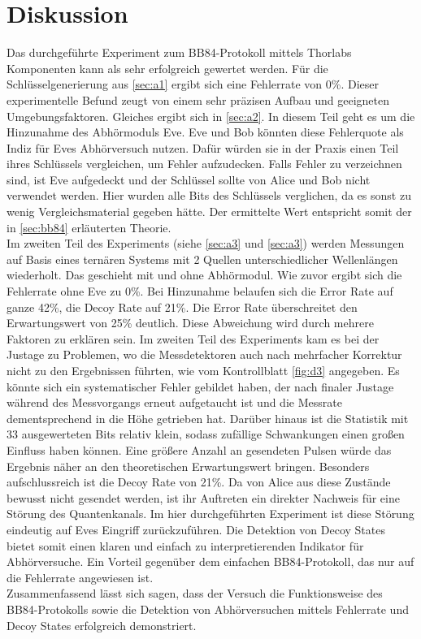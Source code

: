 \section{Diskussion}
\label{sec:Diskussion}

Das durchgeführte Experiment zum BB84-Protokoll mittels Thorlabs Komponenten kann 
als sehr erfolgreich gewertet werden. Für die Schlüsselgenerierung aus \autoref{sec:a1}
ergibt sich eine Fehlerrate von 0\%. Dieser experimentelle Befund zeugt von einem 
sehr präzisen Aufbau und geeigneten Umgebungsfaktoren. Gleiches ergibt sich in 
\autoref{sec:a2}. In diesem Teil geht es um die Hinzunahme des Abhörmoduls Eve. 
Eve und Bob könnten diese Fehlerquote als Indiz für Eves Abhörversuch nutzen. Dafür
würden sie in der Praxis einen Teil ihres Schlüssels vergleichen, um Fehler 
aufzudecken. Falls Fehler zu verzeichnen sind, ist Eve aufgedeckt und der Schlüssel 
sollte von Alice und Bob nicht verwendet werden. Hier wurden alle Bits des Schlüssels
verglichen, da es sonst zu wenig Vergleichsmaterial gegeben hätte. Der ermittelte 
Wert entspricht somit der in \autoref{sec:bb84} erläuterten Theorie.
\vspace{0.5em}
\\
\noindent Im zweiten Teil des Experiments (siehe \autoref{sec:a3} und \autoref{sec:a3}) werden Messungen auf Basis eines ternären
Systems mit 2 Quellen unterschiedlicher Wellenlängen wiederholt. Das geschieht mit 
und ohne Abhörmodul. Wie zuvor ergibt sich die Fehlerrate ohne Eve zu 0\%. Bei 
Hinzunahme belaufen sich die Error Rate auf ganze 42\%, die Decoy Rate auf 21\%.
Die Error Rate überschreitet den Erwartungswert von 25\% deutlich. Diese Abweichung 
wird durch mehrere Faktoren zu erklären sein. Im zweiten Teil des Experiments kam 
es bei der Justage zu Problemen, wo die Messdetektoren auch nach mehrfacher Korrektur 
nicht zu den Ergebnissen führten, wie vom Kontrollblatt \autoref{fig:d3} angegeben.
Es könnte sich ein systematischer Fehler gebildet haben, der nach finaler Justage 
während des Messvorgangs erneut aufgetaucht ist und die Messrate dementsprechend in 
die Höhe getrieben hat. Darüber hinaus ist die Statistik mit 33 ausgewerteten Bits 
relativ klein, sodass zufällige Schwankungen einen großen Einfluss haben können. 
Eine größere Anzahl an gesendeten Pulsen würde das Ergebnis näher an den theoretischen
Erwartungswert bringen. Besonders aufschlussreich ist die Decoy Rate von 21\%. Da
von Alice aus diese Zustände bewusst nicht gesendet werden, ist ihr Auftreten ein 
direkter Nachweis für eine Störung des Quantenkanals. Im hier durchgeführten 
Experiment ist diese Störung eindeutig auf Eves Eingriff zurückzuführen. Die
Detektion von Decoy States bietet somit einen klaren und einfach zu interpretierenden
Indikator für Abhörversuche. Ein Vorteil gegenüber dem einfachen BB84-Protokoll,
das nur auf die Fehlerrate angewiesen ist.
\\
\noindent Zusammenfassend lässt sich sagen, dass der Versuch die Funktionsweise des BB84-Protokolls
sowie die Detektion von Abhörversuchen mittels Fehlerrate und Decoy States erfolgreich
demonstriert.